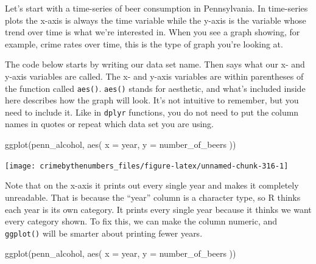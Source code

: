 \documentclass[
  a4paper,
]{krantz}
\makeatletter
\newenvironment{Shaded}{\begin{snugshade}}{\end{snugshade}}
\newcommand{\AttributeTok}[1]{\textcolor[rgb]{0.61,0.61,0.61}{#1}}
\newcommand{\FunctionTok}[1]{\textcolor[rgb]{0,0,0}{#1}}
\newcommand{\NormalTok}[1]{#1}
\newcommand{\OtherTok}[1]{\textcolor[rgb]{0.37,0.37,0.37}{#1}}
\newcommand{\SpecialCharTok}[1]{\textcolor[rgb]{0,0,0}{#1}}
\newenvironment{kframe}{%
\medskip{}
\setlength{\fboxsep}{.8em}
 \def\at@end@of@kframe{}%
 \ifinner\ifhmode%
  \def\at@end@of@kframe{\end{minipage}}%
  \begin{minipage}{\columnwidth}%
 \fi\fi%
 \def\FrameCommand##1{\hskip\@totalleftmargin \hskip-\fboxsep
 \colorbox{shadecolor}{##1}\hskip-\fboxsep
     \hskip-\linewidth \hskip-\@totalleftmargin \hskip\columnwidth}%
 \MakeFramed {\advance\hsize-\width
   \@totalleftmargin\z@ \linewidth\hsize
   \@setminipage}}%
 {\par\unskip\endMakeFramed%
 \at@end@of@kframe}
\renewenvironment{Shaded}{\begin{kframe}}{\end{kframe}}
\makeatother
\begin{document}
Let's start with a time-series of beer consumption in
Pennsylvania. In time-series plots the x-axis is always the
time variable while the y-axis is the variable whose trend
over time is what we're interested in. When you see a graph
showing, for example, crime rates over time, this is the
type of graph you're looking at.

The code below starts by writing our data set name. Then
says what our x- and y-axis variables are called. The x- and
y-axis variables are within parentheses of the function
called \texttt{aes()}. \texttt{aes()} stands for aesthetic,
and what's included inside here describes how the graph will
look. It's not intuitive to remember, but you need to
include it. Like in \texttt{dplyr} functions, you do not
need to put the column names in quotes or repeat which data
set you are using.

\begin{Shaded}
\begin{Highlighting}[]
\FunctionTok{ggplot}\NormalTok{(penn\_alcohol, }\FunctionTok{aes}\NormalTok{(}
  \AttributeTok{x =}\NormalTok{ year,}
  \AttributeTok{y =}\NormalTok{ number\_of\_beers}
\NormalTok{))}
\end{Highlighting}
\end{Shaded}

\begin{center}\texttt{[image: crimebythenumbers\_files/figure-latex/unnamed-chunk-316-1]} \end{center}

Note that on the x-axis it prints out every single year and
makes it completely unreadable. That is because the ``year''
column is a character type, so R thinks each year is its own
category. It prints every single year because it thinks we
want every category shown. To fix this, we can make the
column numeric, and \texttt{ggplot()} will be smarter about
printing fewer years.

\begin{Shaded}
\end{Shaded}

\begin{Shaded}
\begin{Highlighting}[]
\FunctionTok{ggplot}\NormalTok{(penn\_alcohol, }\FunctionTok{aes}\NormalTok{(}
  \AttributeTok{x =}\NormalTok{ year,}
  \AttributeTok{y =}\NormalTok{ number\_of\_beers}
\NormalTok{))}
\end{Highlighting}
\end{Shaded}
\end{document}
